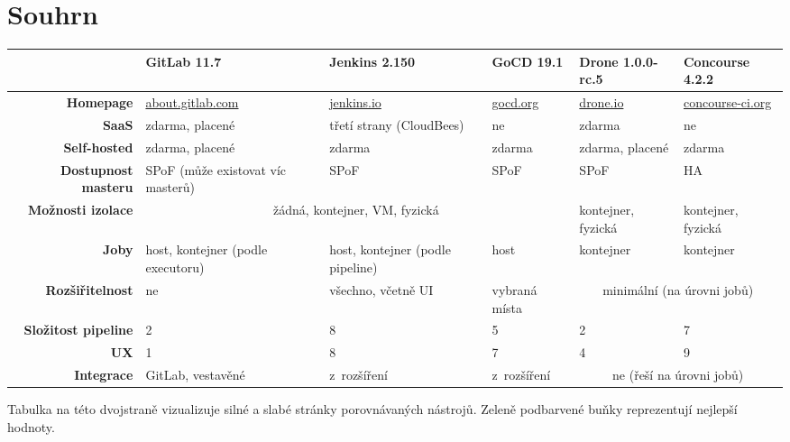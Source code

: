 \newcommand*\cleartoleftpage{%
  \clearpage
  \ifodd\value{page}\hbox{}\newpage\fi
}

\cleartoleftpage
\section{Souhrn}
    \label{overview}

    \begin{adjustwidth}{-2cm}{}
        \begin{tabular}{|r||p{3.2cm}|p{3.2cm}|p{2cm}|p{2cm}|p{2cm}|}\hline
            & \textbf{GitLab 11.7} & \textbf{Jenkins 2.150} & \textbf{GoCD 19.1} & \textbf{Drone 1.0.0-rc.5} & \textbf{Concourse 4.2.2} \\\hline\hline
            \textbf{Homepage} & \url{about.gitlab.com} & \url{jenkins.io} & \url{gocd.org} & \url{drone.io} & \url{concourse-ci.org} \\\hline
            \textbf{SaaS} & zdarma, placené & třetí strany (CloudBees) & ne & zdarma & ne \\\hline
            \textbf{Self-hosted} & zdarma, placené & zdarma & zdarma & zdarma, placené & zdarma \\\hline
            \textbf{Dostupnost masteru} & SPoF (může existovat víc masterů) & SPoF & SPoF & SPoF & HA \\\hline
            \textbf{Možnosti izolace} & \multicolumn{3}{c|}{ žádná, kontejner, VM, fyzická } & kontejner, fyzická & kontejner, fyzická \\\hline
            \textbf{Joby} & host, kontejner (podle executoru) & host, kontejner (podle pipeline) & host & kontejner & kontejner  \\\hline
            \textbf{Rozšiřitelnost} & ne & všechno, včetně UI & vybraná místa & \multicolumn{2}{c|}{ minimální (na úrovni jobů) } \\\hline
            \textbf{Složitost pipeline} & 2 & 8 & 5 & 2 & 7 \\\hline
            \textbf{UX} & 1 & 8 & 7 & 4 & 9  \\\hline
            \textbf{Integrace} & GitLab, vestavěné & z~rozšíření & z~rozšíření & \multicolumn{2}{c|}{ ne (řeší na úrovni jobů) } \\\hline
        \end{tabular}
    \end{adjustwidth}
    \vspace*{0.8cm}

    Tabulka na této dvojstraně vizualizuje silné a slabé stránky porovnávaných \CI nástrojů. Zeleně podbarvené buňky reprezentují nejlepší hodnoty.

